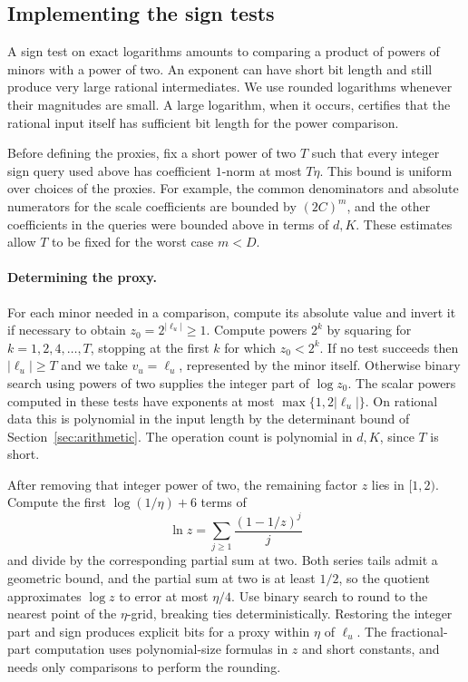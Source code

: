 \subsection{Implementing the sign tests}

A sign test on exact logarithms amounts to comparing a product of
powers of minors with a power of two. An exponent can have short bit
length and still produce very large rational intermediates. We use
rounded logarithms whenever their magnitudes are small. A large
logarithm, when it occurs, certifies that the rational input itself
has sufficient bit length for the power comparison.

Before defining the proxies, fix a short power of two \(T\) such
that every integer sign query used above has coefficient \(1\)-norm
at most \(T\eta\). This bound is uniform over choices of the proxies.
For example, the common denominators and absolute numerators for the
scale coefficients are bounded by \((2C)^m\), and the other
coefficients in the queries were bounded above in terms of \(d,K\).
These estimates allow \(T\) to be fixed for the worst case \(m<D\).

\paragraph{Determining the proxy.}
For each minor needed in a comparison, compute its absolute value
and invert it if necessary to obtain \(z_0=2^{|\ell_u|}\ge1\).
Compute powers \(2^k\) by squaring for \(k=1,2,4,\ldots,T\), stopping
at the first \(k\) for which \(z_0<2^k\). If no test succeeds then
\(|\ell_u|\ge T\) and we take \(v_u=\ell_u\), represented by the
minor itself. Otherwise binary search using powers of two supplies
the integer part of \(\log z_0\). The scalar powers computed in these
tests have exponents at most \(\max\{1,2|\ell_u|\}\). On rational
data this is polynomial in the input length by the determinant bound
of Section~\ref{sec:arithmetic}. The operation count is polynomial
in \(d,K\), since \(T\) is short.

After removing that integer power of two, the remaining factor
\(z\) lies in \([1,2)\). Compute the first \(\log(1/\eta)+6\) terms of
\[
 \ln z=\sum_{j\ge1}\frac{(1-1/z)^j}{j}
\]
and divide by the corresponding partial sum at two. Both series
tails admit a geometric bound, and the partial sum at two is at
least \(1/2\), so the quotient approximates \(\log z\) to error at
most \(\eta/4\). Use binary search to round to the nearest point of
the \(\eta\)-grid, breaking ties deterministically. Restoring the
integer part and sign produces explicit bits for a proxy within
\(\eta\) of \(\ell_u\). The fractional-part computation uses
polynomial-size formulas in \(z\) and short constants, and needs
only comparisons to perform the rounding.

